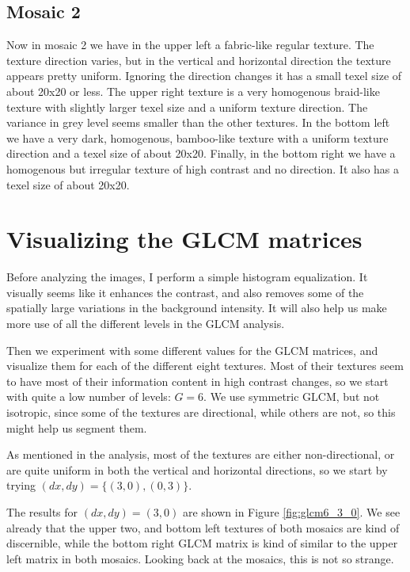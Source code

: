 \documentclass[a4paper]{article}
\begin{document}
\subsection{Mosaic 2}

Now in mosaic 2 we have in the upper left a fabric-like regular
texture. The texture direction varies, but in the vertical and
horizontal direction the texture appears pretty uniform. Ignoring the
direction changes it has a
small texel size of about 20x20 or less. The upper right texture is a very
homogenous braid-like texture with slightly larger texel size and a
uniform texture direction. The variance in grey level seems smaller than
the other textures. In the bottom left we have a very dark,
homogenous, bamboo-like texture with a uniform texture direction and a
texel size of about 20x20. Finally, in the bottom right we have a
homogenous but irregular texture of high contrast and no direction. It
also has a texel size of about 20x20.

\section{Visualizing the GLCM matrices}

Before analyzing the images, I perform a simple histogram equalization.
It visually seems like it enhances the contrast, and also removes some
of the spatially large variations in the background intensity. It will
also help us make more use of all the different levels in the GLCM
analysis.

Then we experiment with some different values for the GLCM matrices, and
visualize them for each of the different eight textures. Most of their
textures seem to have most of their information content in high contrast
changes, so we start with quite a low number of levels: $G = 6$. We
use symmetric GLCM, but not isotropic, since some of the textures are
directional, while others are not, so this might help us segment them.

As mentioned in the analysis, most of the textures are either
non-directional, or are quite uniform in both the vertical and
horizontal directions, so we start by trying $(dx, dy) = \{(3, 0), (0,
3)\}$.

The results for $(dx, dy) = (3, 0)$ are shown in Figure
\ref{fig:glcm6_3_0}. We see already that the upper two, and bottom left
textures of both mosaics are kind of discernible, while the bottom right
GLCM matrix is kind of similar to the upper left matrix in both mosaics.
Looking back at the mosaics, this is not so strange.
\end{document}

